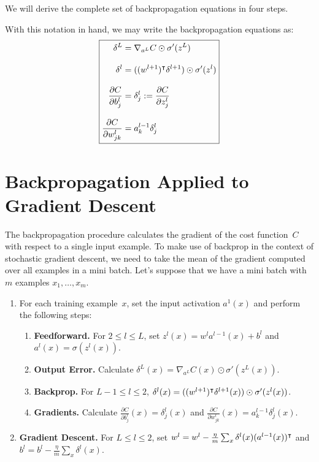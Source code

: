 We will derive the complete set of backpropagation equations in four steps.

With this notation in hand, we may write the backpropagation equations
as:
\begin{equation}
\boxed{
\setlength{\jot}{12pt}
\begin{aligned}
    \delta^{L} & = \nabla_{a^L} C \odot \sigma'(z^L) \\
    \delta^{l} & = ( \trans{(w^{l + 1})} \delta^{l + 1} ) \odot \sigma'(z^l) \\
    \frac{\partial C}{\partial b_j^{l}} & = \delta_{j}^l := \frac{\partial C}{\partial z_j^l}\\
    \frac{\partial C}{\partial w_{j k}^l} & = a_{k}^{l - 1} \delta_{j}^l
\end{aligned}
}
\end{equation}

\section{Backpropagation Applied to Gradient Descent}

The backpropagation procedure calculates the gradient of the cost
function~$C$ with respect to a single input example. To make use of
backprop in the context of stochastic gradient descent, we need to take
the mean of the gradient computed over all examples in a mini batch.
Let's suppose that we have a mini batch with $m$ examples
$x_1, \ldots, x_m$.
\begin{enumerate}
    \item For each training example~$x$, set the input activation
        $a^1 (x)$ and perform the following steps:
        \begin{enumerate}
            \item \textbf{Feedforward.} For $2 \leq l \leq L$, set
                $z^l (x) = w^l a^{l - 1} (x) + b^l$ and
                $a^l (x) = \sigma (z^l (x))$.
            \item \textbf{Output Error.} Calculate
                $\delta^L (x) = \nabla_{a^L} C(x) \odot \sigma' (z^L (x) )$.
            \item \textbf{Backprop.} For $L - 1 \leq l \leq 2$,
                $\delta^l (x) = ( (w^{l + 1})^{\intercal} \delta^{l + 1} (x) )
                                    \odot \sigma' (z^l (x))$.
            \item \textbf{Gradients.} Calculate
            $ \frac{\partial C}{\partial b_j^{l}} (x) = \delta_{j}^l (x)$
            and $\frac{\partial C}{\partial w_{j k}^l} (x)
                    = a_{k}^{l - 1} \delta_{j}^l (x)$.
        \end{enumerate}
    \item \textbf{Gradient Descent.} For $L \leq l \leq 2$, set
        $w^l = w^l - \frac{\eta}{m} \sum_{x} \delta^{l} (x) (a^{l - 1} (x))^{\intercal}$
        and
        $b^l = b^l - \frac{\eta}{m} \sum_{x} \delta^l (x)$.
\end{enumerate}
